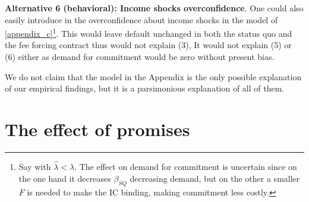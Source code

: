 \documentclass[oneside,11pt]{article}
\begin{document}
\vspace{.1in}
\noindent \textbf{Alternative 6 (behavioral): Income shocks overconfidence}. One could also easily introduce in the overconfidence about income shocks in the model of \ref{appendix_c}\footnote{Say with $\widehat{\lambda} <\lambda$. The effect on demand for commitment is uncertain since on the one hand it decreases $\beta_{SQ}$ decreasing demand, but on the other a smaller $F$ is needed to make the IC binding, making commitment less costly.}. This would leave default unchanged in both the status quo and the fee forcing contract thus would not explain (3), %
It would not explain (5) or (6) either as demand for commitment would be zero without present bias. 




\vspace{.1in}
We do not claim that the model in the Appendix is the only possible explanation of our empirical findings, but it is a parsimonious explanation of all of them.


\section{The effect of promises} \label{promises}
\end{document}

